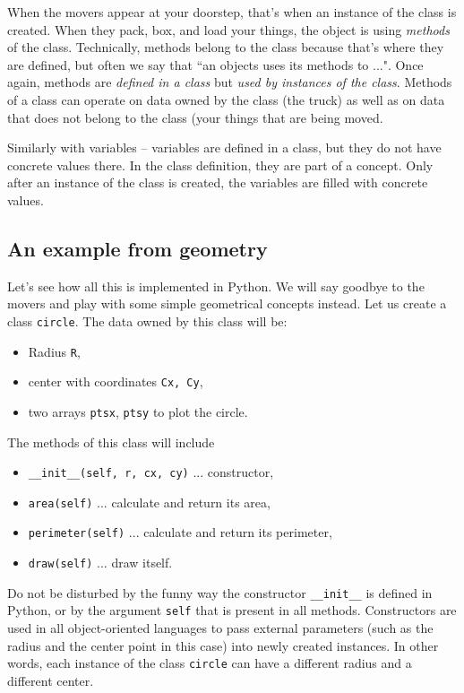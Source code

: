 When the movers appear at your doorstep, that's when an instance 
of the class is created. When they pack, box, and load your things, the object is using 
{\em methods} of the class. Technically, methods belong to the class because that's
where they are defined, but often we say that ``an objects uses its methods to ...". 
Once again, methods are {\em defined in a class} but {\em used 
by instances of the class}. 
Methods of a class can operate on data owned by the class (the truck) as well as 
on data that does not belong to the class (your things that are being moved.

Similarly with variables -- variables are defined in a class, but they do not 
have concrete values there. In the class definition, they are part of a concept. 
Only after an instance of the class is created, the variables are filled with 
concrete values. 

\subsection{An example from geometry}

Let's see how all this is implemented in Python. We will say goodbye to the movers
and play with some simple geometrical concepts instead. Let us create a class
{\tt circle}. The data owned by this class will be:

\begin{itemize}
\item Radius {\tt R}, 
\item center with coordinates {\tt Cx, Cy}, 
\item two arrays {\tt ptsx}, {\tt ptsy} to plot the circle. 
\end{itemize}
The methods of this class will include 
\begin{itemize}
\item {\tt \_\_init\_\_(self, r, cx, cy)} ... constructor,
\item {\tt area(self)} ... calculate and return its area,
\item {\tt perimeter(self)} ... calculate and return its perimeter,
\item {\tt draw(self)} ... draw itself.
\end{itemize}
Do not be disturbed by the funny way the constructor {\tt \_\_init\_\_} 
is defined in Python, or by the argument {\tt self} that is present 
in all methods. Constructors are 
used in all object-oriented languages to pass external parameters 
(such as the radius and the center point in this case) into newly 
created instances. In other words, each instance of the class {\tt circle} 
can have a different radius and a different center.

